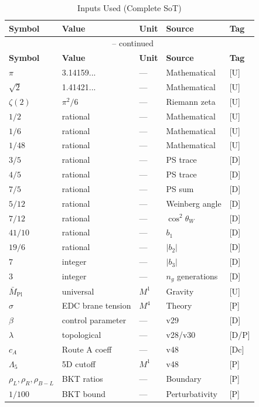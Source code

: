 \documentclass[11pt,a4paper]{article}
\theoremstyle{definition}
\begin{document}
\begin{longtable}{@{}lllll@{}}
\caption{Inputs Used (Complete SoT)} \label{tab:inputs_sot} \\
\toprule
\textbf{Symbol} & \textbf{Value} & \textbf{Unit} & \textbf{Source} & \textbf{Tag} \\
\midrule
\endfirsthead
\multicolumn{5}{c}{{\tablename\ \thetable{} -- continued}} \\
\toprule
\textbf{Symbol} & \textbf{Value} & \textbf{Unit} & \textbf{Source} & \textbf{Tag} \\
\midrule
\endhead
\bottomrule
\endfoot
$\pi$ & 3.14159... & --- & Mathematical & [U] \\
$\sqrt{2}$ & 1.41421... & --- & Mathematical & [U] \\
$\zeta(2)$ & $\pi^2/6$ & --- & Riemann zeta & [U] \\
$1/2$ & rational & --- & Mathematical & [U] \\
$1/6$ & rational & --- & Mathematical & [U] \\
$1/48$ & rational & --- & Mathematical & [U] \\
$3/5$ & rational & --- & PS trace & [D] \\
$4/5$ & rational & --- & PS trace & [D] \\
$7/5$ & rational & --- & PS sum & [D] \\
$5/12$ & rational & --- & Weinberg angle & [D] \\
$7/12$ & rational & --- & $\cos^2\theta_W$ & [D] \\
$41/10$ & rational & --- & $b_1$ & [D] \\
$19/6$ & rational & --- & $|b_2|$ & [D] \\
$7$ & integer & --- & $|b_3|$ & [D] \\
$3$ & integer & --- & $n_g$ generations & [D] \\
$\bar{M}_{\text{Pl}}$ & universal & $M^1$ & Gravity & [U] \\
$\sigma$ & EDC brane tension & $M^4$ & Theory & [P] \\
$\beta$ & control parameter & --- & v29 & [D] \\
$\lambda$ & topological & --- & v28/v30 & [D/P] \\
$c_A$ & Route A coeff & --- & v48 & [Dc] \\
$\Lambda_5$ & 5D cutoff & $M^1$ & v48 & [P] \\
$\rho_L, \rho_R, \rho_{B-L}$ & BKT ratios & --- & Boundary & [P] \\
$1/100$ & BKT bound & --- & Perturbativity & [P] \\
\end{longtable}
\end{document}
